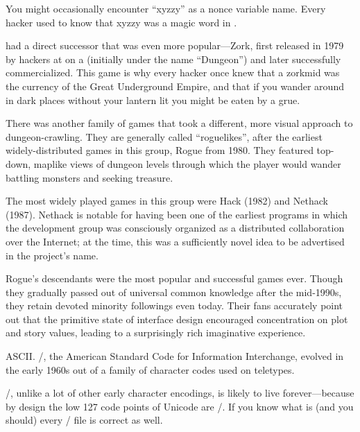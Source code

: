 You might occasionally encounter ``xyzzy'' as a nonce variable name. Every hacker
used to know that xyzzy was a magic word in .

 had a direct successor that was even more popular---Zork, first released
in 1979 by hackers at  on a  (initially under the name ``Dungeon'') and
later successfully commercialized. This game is why every hacker once knew that
a zorkmid was the currency of the Great Underground Empire, and that if you
wander around in dark places without your lantern lit you might be eaten by a
grue.

There was another family of games that took a different, more visual approach
to dungeon-crawling. They are generally called ``roguelikes'', after the earliest
widely-distributed games in this group, Rogue from 1980. They featured
top-down, maplike views of dungeon levels through which the player would wander
battling monsters and seeking treasure.

The most widely played games in this group were Hack (1982) and Nethack (1987).
Nethack is notable for having been one of the earliest programs in which the
development group was consciously organized as a distributed collaboration over
the Internet; at the time, this was a sufficiently novel idea to be advertised
in the project's name.

Rogue's descendants were the most popular and successful  games ever. Though
they gradually passed out of universal common knowledge after the mid-1990s,
they retain devoted minority followings even today. Their fans accurately point
out that the primitive state of interface design encouraged concentration on
plot and story values, leading to a surprisingly rich imaginative experience.

\sect ASCII.
\ASCII/, the American Standard Code for Information Interchange, evolved in the
early 1960s out of a family of character codes used on teletypes.

\ASCII/, unlike a lot of other early character encodings, is likely to live
forever---because by design the low 127 code points of Unicode are \ASCII/. If
you know what  is (and you should) every \ASCII/ file is correct  as
well.

